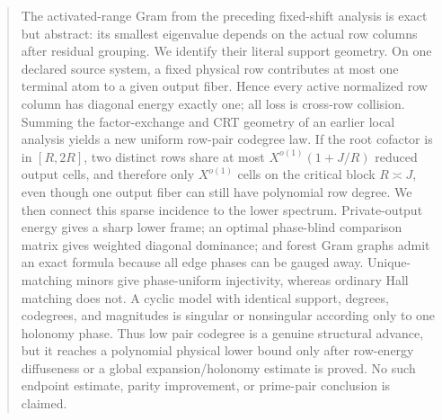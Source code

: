 \begin{abstract}
The activated-range Gram from the preceding fixed-shift analysis is exact but
abstract: its smallest eigenvalue depends on the actual row columns after
residual grouping. We identify their literal support geometry. On one declared
source system, a fixed physical row contributes at most one terminal atom to a
given output fiber. Hence every active normalized row column has diagonal
energy exactly one; all loss is cross-row collision. Summing the factor-exchange
and CRT geometry of an earlier local analysis yields a new uniform row-pair
codegree law. If the root cofactor is in \([R,2R]\), two distinct rows share at
most \(X^{o(1)}(1+J/R)\) reduced output cells, and therefore only \(X^{o(1)}\)
cells on the critical block \(R\asymp J\), even though one output fiber can
still have polynomial row degree. We then connect this sparse incidence to
the lower spectrum. Private-output energy gives a sharp lower frame; an
optimal phase-blind comparison matrix gives weighted diagonal dominance; and
forest Gram graphs admit an exact formula because all edge phases can be
gauged away. Unique-matching minors give phase-uniform injectivity, whereas
ordinary Hall matching does not. A cyclic model with identical support,
degrees, codegrees, and magnitudes is singular or nonsingular according only
to one holonomy phase. Thus low pair codegree is a genuine structural advance,
but it reaches a polynomial physical lower bound only after row-energy
diffuseness or a global expansion/holonomy estimate is proved. No such
endpoint estimate, parity improvement, or prime-pair conclusion is claimed.
\end{abstract}
